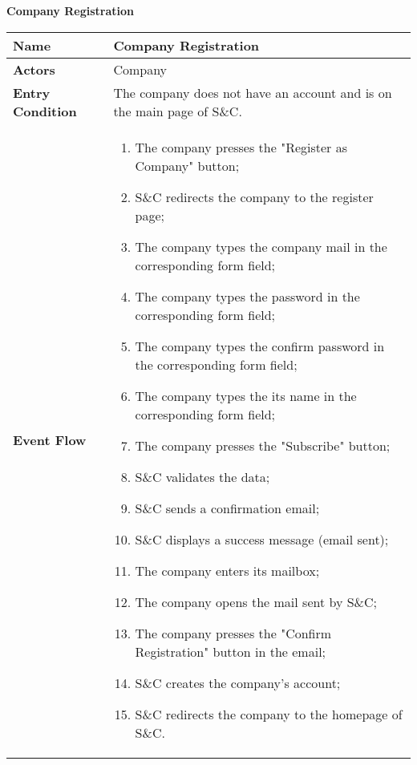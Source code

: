         \begin{enumerate}[label=\textbf{[US\arabic*]}, left = 0pt, align = left, resume]
            \item \textbf{Company Registration}
        
            \begin{longtable}{|l|p{11cm}|}  
                \hline
                \textbf{Name} & 
                    \textbf{Company Registration} \\
                \hline
                
                \textbf{Actors} & 
                    Company \\
                \hline
                
                \textbf{Entry Condition} & 
                    The company does not have an account and is on the main page of S\&C. \\
                \hline
                
                \textbf{Event Flow} &
                    \begin{enumerate}[label=\arabic*., itemsep=0.2em]
                        \item The company presses the "Register as Company" button;
                        \item S\&C redirects the company to the register page;
                        \item The company types the company mail in the corresponding form field;
                        \item The company types the password in the corresponding form field;
                        \item The company types the confirm password in the corresponding form field;
                        \item The company types the its name in the corresponding form field;
                        \item The company presses the "Subscribe" button;
                        \item S\&C validates the data;
                        \item S\&C sends a confirmation email;
                        \item S\&C displays a success message (email sent);
                        \item The company enters its mailbox;
                        \item The company opens the mail sent by S\&C;
                        \item The company presses the "Confirm Registration" button in the email;
                        \item S\&C creates the company's account;
                        \item S\&C redirects the company to the homepage of S\&C.
                    \end{enumerate} \\
                \hline
                

\end{longtable}
\end{enumerate}
